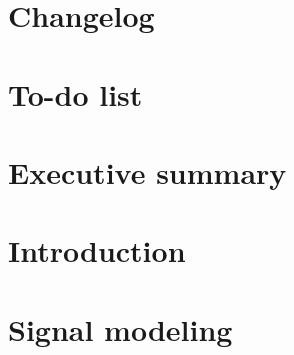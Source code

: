 \documentclass[NOTE, atlasdraft=true, texlive=2016, UKenglish]{atlasdoc}
\begin{document}
\maketitle

\tableofcontents

\clearpage
{}
\clearpage



\FloatBarrier
\section{Changelog}
\label{sec:changelog}

\FloatBarrier
\section{To-do list}
\label{sec:todo}

\FloatBarrier
\section{Executive summary}
\label{sec:exec_summ}

\FloatBarrier
\section{Introduction}
\label{sec:intro}


\FloatBarrier
\section{Signal modeling}
\label{sec:sig}
\end{document}

